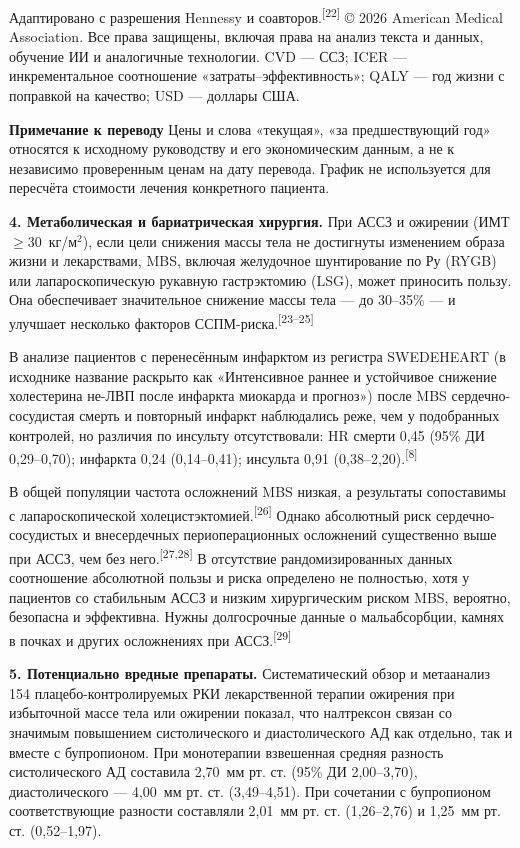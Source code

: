 \documentclass[11pt,a4paper]{article}
\newcommand{\src}[1]{\textsuperscript{[#1]}}
\newcommand{\editorial}[1]{\par\begingroup\small\color{black!70}\textbf{Примечание к переводу} #1\par\endgroup}
\begin{document}
Адаптировано с разрешения Hennessy и соавторов.\src{22} © 2026 American Medical Association. Все права защищены, включая права на анализ текста и данных, обучение ИИ и аналогичные технологии. CVD --- ССЗ; ICER --- инкрементальное соотношение «затраты--эффективность»; QALY --- год жизни с поправкой на качество; USD --- доллары США.
\editorial{Цены и слова «текущая», «за предшествующий год» относятся к исходному руководству и его экономическим данным, а не к независимо проверенным ценам на дату перевода. График не используется для пересчёта стоимости лечения конкретного пациента.}

\textbf{4. Метаболическая и бариатрическая хирургия.} При АССЗ и ожирении (ИМТ $\geq30$~кг/м$^2$), если цели снижения массы тела не достигнуты изменением образа жизни и лекарствами, MBS, включая желудочное шунтирование по Ру (RYGB) или лапароскопическую рукавную гастрэктомию (LSG), может приносить пользу. Она обеспечивает значительное снижение массы тела --- до 30--35\% --- и улучшает несколько факторов ССПМ-риска.\src{23--25}

В анализе пациентов с перенесённым инфарктом из регистра SWEDEHEART (в исходнике название раскрыто как «Интенсивное раннее и устойчивое снижение холестерина не-ЛВП после инфаркта миокарда и прогноз») после MBS сердечно-сосудистая смерть и повторный инфаркт наблюдались реже, чем у подобранных контролей, но различия по инсульту отсутствовали: HR смерти 0,45 (95\% ДИ 0,29--0,70); инфаркта 0,24 (0,14--0,41); инсульта 0,91 (0,38--2,20).\src{8}

В общей популяции частота осложнений MBS низкая, а результаты сопоставимы с лапароскопической холецистэктомией.\src{26} Однако абсолютный риск сердечно-сосудистых и внесердечных периоперационных осложнений существенно выше при АССЗ, чем без него.\src{27,28} В отсутствие рандомизированных данных соотношение абсолютной пользы и риска определено не полностью, хотя у пациентов со стабильным АССЗ и низким хирургическим риском MBS, вероятно, безопасна и эффективна. Нужны долгосрочные данные о мальабсорбции, камнях в почках и других осложнениях при АССЗ.\src{29}

\textbf{5. Потенциально вредные препараты.} Систематический обзор и метаанализ 154 плацебо-контролируемых РКИ лекарственной терапии ожирения при избыточной массе тела или ожирении показал, что налтрексон связан со значимым повышением систолического и диастолического АД как отдельно, так и вместе с бупропионом. При монотерапии взвешенная средняя разность систолического АД составила 2,70~мм рт. ст. (95\% ДИ 2,00--3,70), диастолического --- 4,00~мм рт. ст. (3,49--4,51). При сочетании с бупропионом соответствующие разности составляли 2,01~мм рт. ст. (1,26--2,76) и 1,25~мм рт. ст. (0,52--1,97).
\end{document}
